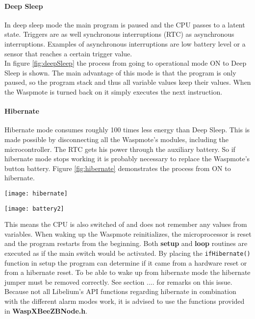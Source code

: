 \paragraph{Deep Sleep}
In deep sleep mode the main program is paused and the CPU passes to a latent state. Triggers are as well synchronous interruptions (RTC) as asynchronous interruptions. Examples of asynchronous interruptions are low battery level or a sensor that reaches a certain trigger value.\bigskip
\\In figure \ref{fig:deepSleep} the process from going to operational mode ON to Deep Sleep is shown. The main advantage of this mode is that the program is only paused, so the program stack and thus all variable values keep their values. When the Waspmote is turned back on it simply executes the next instruction.
\paragraph{Hibernate}
Hibernate mode consumes roughly 100 times less energy than Deep Sleep. This is made possible by disconnecting all the Waspmote's modules, including the microcontroller. The RTC gets his power through the auxiliary battery. So if hibernate mode stops working it is probably necessary to replace the Waspmote's button battery. Figure \ref{fig:hibernate} demonstrates the process from ON to hibernate.\\
\begin{figure*}[ht]
\centering
\texttt{[image: hibernate]}
\caption{Waspmote going from ON to Hibernate}
\label{fig:hibernate}
\end{figure*}
\begin{figure*}[!ht]
\centering
\texttt{[image: battery2]}
\caption{Battery life High Performance vs. Power Saver}
\label{fig:batCalcPS}
\end{figure*}
This means the CPU is also switched of and does not remember any values from variables. When waking up the Waspmote reinitializes, the microprocessor is reset and the program restarts from the beginning. Both \textbf{setup} and \textbf{loop} routines are executed as if the main switch would be activated. By placing the \verb+ifHibernate()+ function in setup the program can determine if it came from a hardware reset or from a hibernate reset. To be able to wake up from hibernate mode the hibernate jumper must be removed correctly. See section .... for remarks on this issue. \\Because not all Libelium's API functions regarding hibernate in combination with the different alarm modes work, it is advised to use the functions provided in \textbf{WaspXBeeZBNode.h}. 
